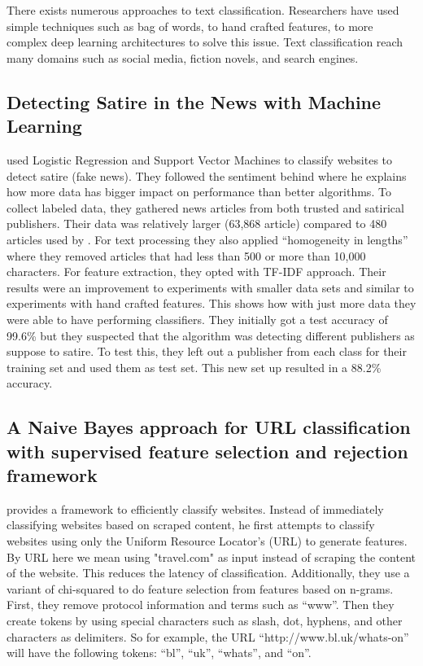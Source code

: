 \documentclass[12pt]{article}
\begin{document}
\setcounter{subsection}{0}
\addtocounter{section}{1}

There exists numerous approaches to text classification. Researchers have used simple techniques such as bag of words, to hand crafted features, to more complex deep learning architectures to solve this issue. Text classification reach many domains such as social media, fiction novels, and search engines.  

\begin{center}
\subsection{Detecting Satire in the News with Machine Learning}
\end{center}


\cite{detect} used Logistic Regression and Support Vector Machines to classify websites to detect satire (fake news). They followed the sentiment behind \cite{Halevy:2009:UED:1525642.1525689} where he explains how more data has bigger impact on performance than better algorithms. To collect labeled data, they gathered news articles from both trusted and satirical publishers. Their data was relatively larger (63,868 article) compared to 480 articles used by \cite{Rubin:2015:DDN:2857070.2857153} . For text processing they also applied ``homogeneity in lengths'' where they removed articles that had less than 500 or more than 10,000 characters. For feature extraction, they opted with TF-IDF approach. Their results were an improvement to experiments with smaller data sets and similar to experiments with hand crafted features. This shows how with just more data they were able to have performing classifiers. They initially got a test accuracy of 99.6\% but they suspected that the algorithm was detecting different publishers as suppose to satire. To test this, they left out a publisher from each class for their training set and used them as test set. This new set up resulted in a 88.2\% accuracy.


\begin{center}
\subsection{A Naive Bayes approach for URL classification with supervised feature selection and rejection framework}
\end{center}


\cite{inbook} provides a framework to efficiently classify websites. Instead of immediately classifying websites based on scraped content, he first attempts to classify websites using only the Uniform Resource Locator's (URL) to generate features. By URL here we mean using "travel.com" as input instead of scraping the content of the website. This reduces the latency of classification. Additionally, they use a variant of chi-squared to do feature selection from features based on n-grams. First, they remove protocol information and terms such as ``www''. Then they create tokens by using special characters such as slash, dot, hyphens, and other characters as delimiters. So for example, the URL ``http://www.bl.uk/whats-on'' will have the following tokens: ``bl'', ``uk'', ``whats'', and ``on''. 
\end{document}
